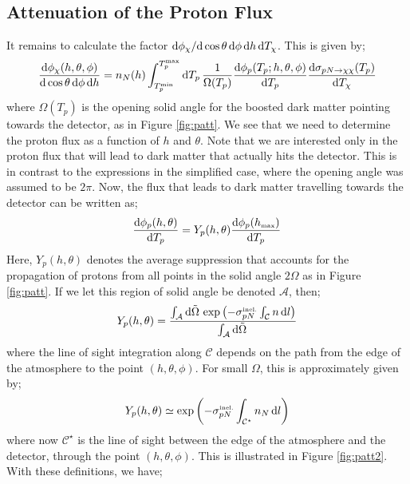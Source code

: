 \documentclass[10pt]{article}
\begin{document}
\subsection{Attenuation of the Proton Flux}
It remains to calculate the factor $\text{d} \phi_\chi / \text{d} \cos\theta \, \text{d} \phi \,\text{d} h \, \text{d} T_\chi$. This is given by;
\begin{equation}
  \frac{\text{d} \phi_\chi (h, \theta, \phi)}{\text{d}\cos\theta \, \text{d} \phi \, \text{d} h} = n_N(h) \int_{T_p^{\textrm{\tiny min}}}^{T_p^{\textrm{\tiny max}}}{\text{d}T_p \,\frac{1}{\Omega(T_p)}\frac{\text{d}\phi_p(T_p; h, \theta, \phi)}{\text{d} T_p}\frac{\text{d} \sigma_{pN \rightarrow \chi\chi}(T_p)}{\text{d} T_\chi}}
\end{equation}
where $\Omega(T_p)$ is the opening solid angle for the boosted dark matter pointing towards the detector, as in Figure \ref{fig:patt}. We see that we need to determine the proton flux as a function of $h$ and $\theta$. Note that we are interested only in the proton flux that will lead to dark matter that actually hits the detector. This is in contrast to the expressions in the simplified case, where the opening angle was assumed to be $2\pi$. Now, the flux that leads to dark matter travelling towards the detector can be written as;
\begin{equation}
  \frac{\text{d} \phi_p(h, \theta)}{\text{d} T_p} = Y_p(h, \theta)\frac{\text{d} \phi_p(h_{\textrm{\tiny max}})}{\text{d} T_p}
\end{equation}
Here, $Y_p(h, \theta)$ denotes the average suppression that accounts for the propagation of protons from all points in the solid angle $2\Omega$ as in Figure \ref{fig:patt}. If we let this region of solid angle be denoted $\mathcal{A}$, then;
\begin{equation}
  Y_p(h, \theta) = \frac{\int_{\mathcal{A}}{\text{d}\tilde{\Omega} \, \exp\left(-\sigma_{pN}^{\textrm{\tiny inel.}} \int_{\mathcal{C}}{n\,\text{d} l}\right)   }}{\int_{\mathcal{A}}{\text{d}\tilde{\Omega} \,}}
\end{equation}
where the line of sight integration along $\mathcal{C}$ depends on the path from the edge of the atmosphere to the point $(h, \theta, \phi)$. For small $\Omega$, this is approximately given by;
\begin{equation}
  Y_p(h, \theta) \simeq \exp\left(-\sigma_{pN}^{\textrm{\tiny inel.}} \int_{\mathcal{C^\star}}{n_N \, \text{d} l}\right)
\end{equation}
where now $\mathcal{C}^\star$ is the line of sight between the edge of the atmosphere and the detector, through the point $(h, \theta, \phi)$. This is illustrated in Figure \ref{fig:patt2}. With these definitions, we have;
\end{document}
